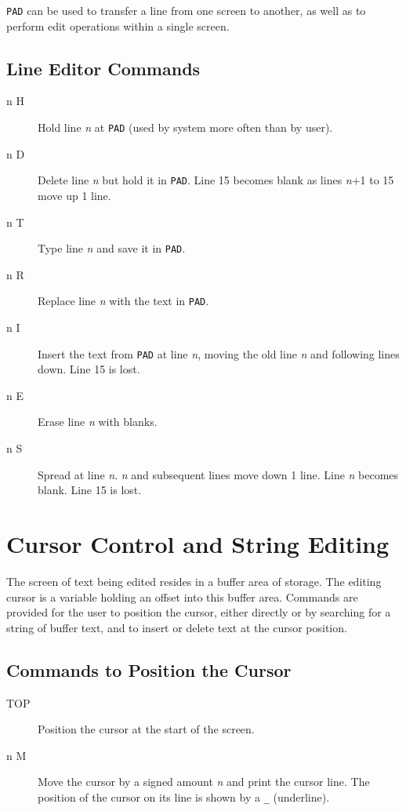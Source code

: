 \documentclass{article}
\newcommand{\n}{\textit{n}}
\begin{document}
\begin{multicols*}{2}[]
	\verb|PAD| can be used to transfer a line from one screen to another,
	as well as to perform edit operations within a single screen.

	\subsection{Line Editor Commands}
	\begin{description}
		\item[n H]
			Hold line \n{} at \verb|PAD|
			(used by system more often than by user).
		\item[n D]
			Delete line \n{} but hold it in \verb|PAD|.
			Line 15 becomes blank as lines \n{}+1 to 15 move up 1 line.
		\item[n T]
			Type line \n{} and save it in \verb|PAD|.
		\item[n R]
			Replace line \n{} with the text in \verb|PAD|.
		\item[n I]
			Insert the text from \verb|PAD| at line \n{},
			moving the old line \n{} and following lines down.
			Line 15 is lost.
		\item[n E]
			Erase line \n{} with blanks.
		\item[n S]
			Spread at line \n{}. \n{} and subsequent lines
			move down 1 line. Line \n{} becomes blank.
			Line 15 is lost.
	\end{description}

	\section{Cursor Control and String Editing}

	The screen of text being edited resides in a buffer area of
	storage. The editing cursor is a variable holding an offset into
	this buffer area. Commands are provided for the user to position
	the cursor, either directly or by searching for a string of buffer
	text, and to insert or delete text at the cursor position.

	\subsection{Commands to Position the Cursor}
	\begin{description}
		\item[TOP]
			Position the cursor at the start of the screen.
		\item[n M]
			Move the cursor by a signed amount \n{} and
			print the cursor line. The position of the cursor on
			its line is shown by a \verb|_| (underline).
	\end{description}


\end{multicols*}
\end{document}
